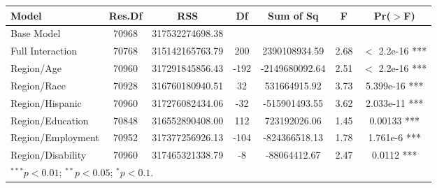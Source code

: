 \documentclass{article}
\begin{document}
	\begin{table}[ht]
		\centering
		\begin{tabular}{lcccccc}
			\hline
			Model & Res.Df & RSS & Df & Sum of Sq & F & Pr($>$F) \\ 
			\hline
			Base Model & 70968 & 317532274698.38 &  &  &  &  \\ 
			Full Interaction & 70768 & 315142165763.79 & 200 & 2390108934.59 & 2.68 & $<$ 2.2e-16 *** \\ 
			Region/Age & 70960 & 317291845856.43 & -192 & -2149680092.64 & 2.51 & $<$ 2.2e-16 *** \\ 
			Region/Race & 70928 & 316760180940.51 & 32 & 531664915.92 & 3.73 & 5.399e-16 *** \\ 
			Region/Hispanic & 70960 & 317276082434.06 & -32 & -515901493.55 & 3.62 & 2.033e-11 *** \\ 
			Region/Education & 70848 & 316552890408.00 & 112 & 723192026.06 & 1.45 & 0.00133 *** \\ 
			Region/Employment & 70952 & 317377256926.13 & -104 & -824366518.13 & 1.78 & 1.761e-6 *** \\ 
			Region/Disability & 70960 & 317465321338.79 & -8 & -88064412.67 & 2.47 & 0.0112 *** \\ 
			\hline
			\multicolumn{7}{l}{\scriptsize{$^{***}p<0.01$; $^{**}p<0.05$; $^{*}p<0.1$.}}
		\end{tabular}
	\end{table}
\end{document}
